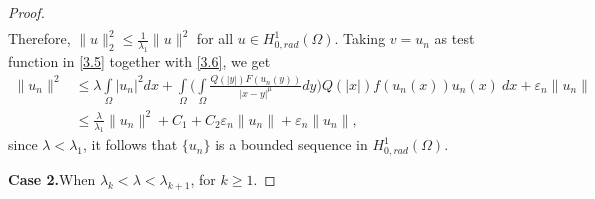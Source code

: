 \documentclass[11pt]{amsart}
\numberwithin{equation}{section}
\newenvironment{case2}[1]{\par\noindent\textbf{Case 2.}\space#1}{}
\newcommand{\hr}{H^1_{0, rad}(\Omega)}
\newcommand{\1}{\frac{1}{2}}
\begin{document}
\begin{proof}
\begin{align*}
		\end{align*}
		Therefore, $ \displaystyle\|u\|^2_2\leq \frac{1}{\lambda_1}\|u\|^2$ for all $u\in \hr$.
		Taking $v= u_n$ as test function in \eqref{3.5} together with \eqref{3.6}, we get
		\begin{align*}
			\|u_n\|^2 &\leq \lambda \int\limits_\Omega |u_n|^2 dx + \int\limits_\Omega \Bigg( \int\limits_\Omega \frac{Q(|y|)F(u_n(y))}{|x-y|^\mu} dy\Bigg) Q(|x|)f(u_n(x)) u_n(x)\ dx + \varepsilon_n \|u_n\| \\
			& \leq \frac{\lambda}{\lambda_1} \|u_n\|^2 + C_1 + C_2 \varepsilon_n \|u_n\| + \varepsilon_n\|u_n\|,
		\end{align*}
		since $\lambda < \lambda_1$, it follows that $\{ u_n\}$ is a bounded sequence in $\hr$.
		
		\begin{case2}
			When $\lambda_k < \lambda < \lambda_{k+1}$, for $k \geq 1$.
		\end{case2}
		

\end{proof}
\end{document}
